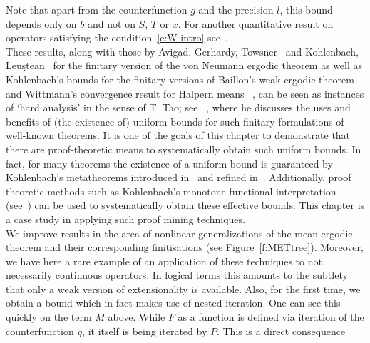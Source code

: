 Note that apart from the counterfunction $g$ and the precision $l$,
this bound depends only on $b$ and not on $S$, $T$ or $x$.
For another quantitative result on operators satisfying the condition~\eqref{e:W-intro} see~\cite{Kohlenbach2011odd}.\\
%
These results, along with those 
by Avigad, Gerhardy, Towsner~\cite{AGT10} and Kohlenbach,  
Leu{\c{s}}tean~\cite{kohlenbachleustean09} for the finitary version of the von Neumann ergodic theorem 
as well as Kohlenbach's bounds for the finitary versions of Baillon's weak ergodic theorem~\cite{Kohlenbach(Baillon)} and Wittmann's 
convergence result for Halpern means~\cite{Kohlenbach2011} 
, 
can be seen as instances of `hard analysis' in the sense of T. Tao; see ~\cite{Tao07, tao-2007}, where he
discusses the uses and benefits of (the existence of) uniform bounds for such finitary formulations of well-known
theorems.
It is one of the goals of this chapter to demonstrate that there are proof-theoretic means to systematically 
obtain such uniform bounds.
In fact, for many theorems the existence of a uniform bound is guaranteed by Kohlenbach's metatheorems
introduced in~\cite{Kohlenbach05meta} and refined in~\cite{GK08}. Additionally, 
proof theoretic methods such as Kohlenbach's monotone functional interpretation (see~\cite{Kohlenbach96mfi}) can be used to
systematically obtain these effective bounds.
This chapter is a case study in applying such proof mining techniques. \\
We improve results in the area of nonlinear
generalizations of the mean ergodic theorem and their corresponding finitisations (see Figure~\ref{f:METtree}). Moreover, 
we have here a rare example of an application of these techniques to not necessarily continuous operators. In logical terms this amounts
to the subtlety that only a weak version of extensionality is available. Also, for the first time,
we obtain a bound which in fact makes use of nested iteration. One can
see this quickly on the term $M$ above. While $F$ as a function is defined via iteration of the counterfunction
$g$, it itself is being iterated by $P$. This is a direct consequence
